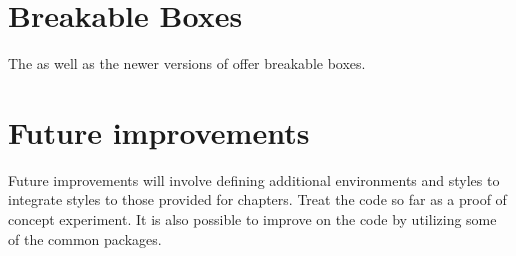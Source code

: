 \section{Breakable Boxes}

The  as well as the newer versions of 
offer breakable boxes.


\begin{tcolorbox}[enhanced,breakable,
  colback=blue!5!white,colframe=blue!75!black,title=Breakable box,
  watermark color=white,watermark text=\Roman{tcbbreakpart}]
  \lipsum[1-18]
\end{tcolorbox}


\section{Future improvements}

Future improvements will involve defining additional environments and styles to integrate styles to those provided for chapters. Treat the code so far as a proof of concept experiment. It is also possible to improve on the code by utilizing some of the common packages.

